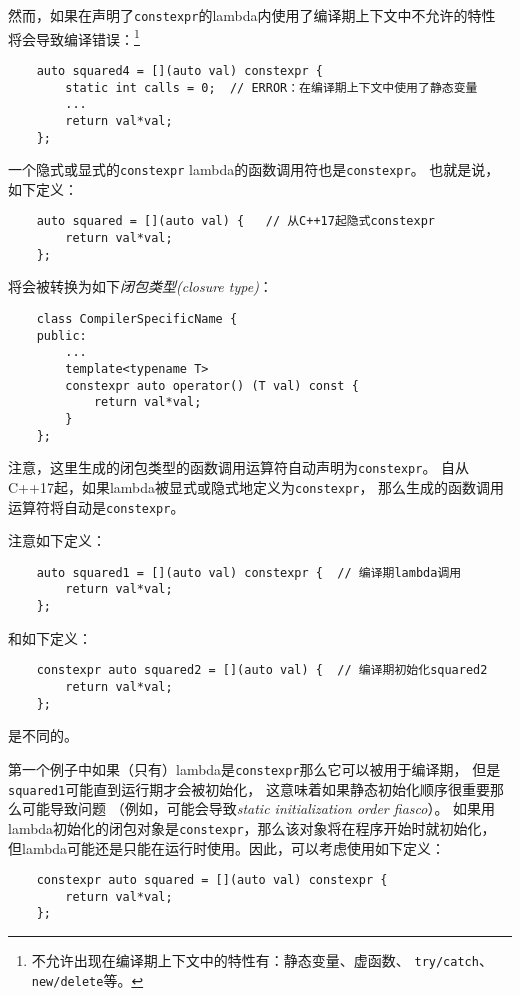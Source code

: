 然而，如果在声明了\texttt{constexpr}的lambda内使用了编译期上下文中不允许的特性
将会导致编译错误：\footnote{不允许出现在编译期上下文中的特性有：静态变量、虚函数、
\texttt{try/catch}、\texttt{new/delete}等。}
\begin{lstlisting}
    auto squared4 = [](auto val) constexpr {
        static int calls = 0;  // ERROR：在编译期上下文中使用了静态变量
        ...
        return val*val;
    };
\end{lstlisting}
一个隐式或显式的\texttt{constexpr} lambda的函数调用符也是\texttt{constexpr}。
也就是说，如下定义：
\begin{lstlisting}
    auto squared = [](auto val) {   // 从C++17起隐式constexpr
        return val*val;
    };
\end{lstlisting}
将会被转换为如下\emph{闭包类型(closure type)}：
\begin{lstlisting}
    class CompilerSpecificName {
    public:
        ...
        template<typename T>
        constexpr auto operator() (T val) const {
            return val*val;
        }
    };
\end{lstlisting}
注意，这里生成的闭包类型的函数调用运算符自动声明为\texttt{constexpr}。
自从C++17起，如果lambda被显式或隐式地定义为\texttt{constexpr}，
那么生成的函数调用运算符将自动是\texttt{constexpr}。

注意如下定义：
\begin{lstlisting}
    auto squared1 = [](auto val) constexpr {  // 编译期lambda调用
        return val*val;
    };
\end{lstlisting}
和如下定义：
\begin{lstlisting}
    constexpr auto squared2 = [](auto val) {  // 编译期初始化squared2
        return val*val;
    };
\end{lstlisting}
是不同的。

第一个例子中如果（只有）lambda是\texttt{constexpr}那么它可以被用于编译期，
但是\texttt{squared1}可能直到运行期才会被初始化，
这意味着如果静态初始化顺序很重要那么可能导致问题
（例如，可能会导致\emph{static initialization order fiasco}）。
如果用lambda初始化的闭包对象是\texttt{constexpr}，那么该对象将在程序开始时就初始化，
但lambda可能还是只能在运行时使用。因此，可以考虑使用如下定义：
\begin{lstlisting}
    constexpr auto squared = [](auto val) constexpr {
        return val*val;
    };
\end{lstlisting}

